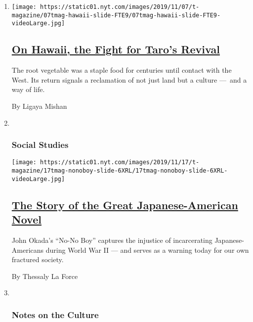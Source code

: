 \begin{enumerate}
\def\labelenumi{\arabic{enumi}.}
\item
  \texttt{[image: https://static01.nyt.com/images/2019/11/07/t-magazine/07tmag-hawaii-slide-FTE9/07tmag-hawaii-slide-FTE9-videoLarge.jpg]}

  \hypertarget{on-hawaii-the-fight-for-taros-revival}{%
  \subsection{\texorpdfstring{\href{/2019/11/08/t-magazine/hawaii-taro.html}{On
  Hawaii, the Fight for Taro's
  Revival}}{On Hawaii, the Fight for Taro's Revival}}\label{on-hawaii-the-fight-for-taros-revival}}

  The root vegetable was a staple food for centuries until contact with
  the West. Its return signals a reclamation of not just land but a
  culture ---~and a way of life.

  By Ligaya Mishan
\item ~
  \hypertarget{social-studies}{%
  \subsubsection{Social Studies}\label{social-studies}}

  \texttt{[image: https://static01.nyt.com/images/2019/11/17/t-magazine/17tmag-nonoboy-slide-6XRL/17tmag-nonoboy-slide-6XRL-videoLarge.jpg]}

  \hypertarget{the-story-of-the-great-japanese-american-novel}{%
  \subsection{\texorpdfstring{\href{/2019/11/04/t-magazine/japanese-american-novel.html}{The
  Story of the Great Japanese-American
  Novel}}{The Story of the Great Japanese-American Novel}}\label{the-story-of-the-great-japanese-american-novel}}

  John Okada's ``No-No Boy'' captures the injustice of incarcerating
  Japanese-Americans during World War II --- and serves as a warning
  today for our own fractured society.

  By Thessaly La Force
\item ~
  \hypertarget{notes-on-the-culture}{%
  \subsubsection{Notes on the Culture}\label{notes-on-the-culture}}


\end{enumerate}
